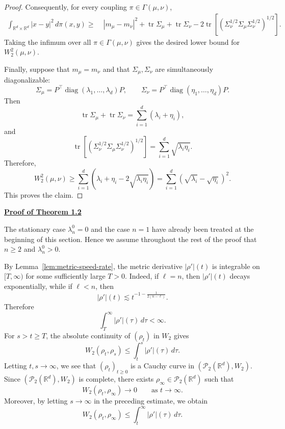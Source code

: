 \documentclass[11pt,reqno]{amsart}
\numberwithin{figure}{section}
\newcommand{\bbr}{\mathbb R}
\newcommand{\dm}{d}
\begin{document}
\begin{proof}
Consequently, for every coupling $\pi\in\Gamma(\mu,\nu)$,
\[
\begin{aligned}
\int_{\mathbb R^{d}\times\bbr^\dm} |x-y|^2\,d\pi(x,y)
\ge\;&
|m_\mu-m_\nu|^2
+
\operatorname{tr}\Sigma_\mu
+
\operatorname{tr}\Sigma_\nu
-
2\operatorname{tr}
\left[
\left(
\Sigma_\nu^{1/2}\Sigma_\mu\Sigma_\nu^{1/2}
\right)^{1/2}
\right].
\end{aligned}
\]
Taking the infimum over all $\pi\in\Gamma(\mu,\nu)$ gives the desired lower
bound for $W_2^2(\mu,\nu)$.

Finally, suppose that $m_\mu=m_\nu$ and that $\Sigma_\mu,\Sigma_\nu$ are
simultaneously diagonalizable:
\[
\Sigma_\mu=P^\top\operatorname{diag}(\lambda_1,\dots,\lambda_d)P,
\qquad
\Sigma_\nu=P^\top\operatorname{diag}(\eta_1,\dots,\eta_d)P.
\]
Then
\[
\operatorname{tr}\Sigma_\mu+\operatorname{tr}\Sigma_\nu
=
\sum_{i=1}^d(\lambda_i+\eta_i),
\]
and
\[
\operatorname{tr}
\left[
\left(
\Sigma_\nu^{1/2}\Sigma_\mu\Sigma_\nu^{1/2}
\right)^{1/2}
\right]
=
\sum_{i=1}^d\sqrt{\lambda_i\eta_i}.
\]
Therefore,
\[
W_2^2(\mu,\nu)
\ge
\sum_{i=1}^d
\left(
\lambda_i+\eta_i-2\sqrt{\lambda_i\eta_i}
\right)
=
\sum_{i=1}^d
\left(\sqrt{\lambda_i}-\sqrt{\eta_i}\right)^2.
\]
This proves the claim.
\end{proof}



\noindent\underline{\textbf{Proof of Theorem 1.2}}

The stationary case \(\lambda_n^0=0\) and the case \(n=1\) have already been treated
at the beginning of this section. Hence we assume throughout the rest of the proof that
\(n\ge2\) and \(\lambda_n^0>0\).

By Lemma~\ref{lem:metric-speed-rate}, the metric derivative \(|\rho'|(t)\) is integrable
on \([T,\infty)\) for some sufficiently large \(T>0\). Indeed, if \(\ell=n\), then
\(|\rho'|(t)\) decays exponentially, while if \(\ell<n\), then
\[
|\rho'|(t)\lesssim t^{-1-\frac{1}{2(n-\ell)}}.
\]
Therefore
\[
\int_T^\infty |\rho'|(\tau)\,d\tau<\infty.
\]
For \(s>t\ge T\), the absolute continuity of \((\rho_t)\) in \(W_2\) gives
\[
W_2(\rho_t,\rho_s)
\le
\int_t^s |\rho'|(\tau)\,d\tau.
\]
Letting \(t,s\to\infty\), we see that \((\rho_t)_{t\ge0}\) is a Cauchy curve in
\((\mathcal P_2(\mathbb R^d),W_2)\). Since \((\mathcal P_2(\mathbb R^d),W_2)\) is complete,
there exists \(\rho_\infty\in\mathcal P_2(\mathbb R^d)\) such that
\[
W_2(\rho_t,\rho_\infty)\to0
\qquad\text{as }t\to\infty.
\]
Moreover, by letting \(s\to\infty\) in the preceding estimate, we obtain
\[
W_2(\rho_t,\rho_\infty)
\le
\int_t^\infty |\rho'|(\tau)\,d\tau.
\]
\end{document}
